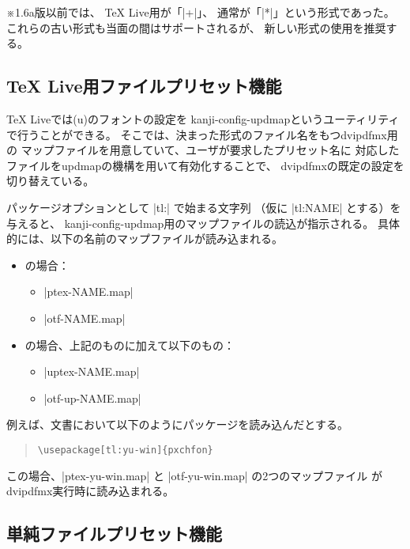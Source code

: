 \documentclass[uplatex,dvipdfmx,a4paper]{jsarticle}
\newcommand{\Note}{\par\noindent ※}
\newcommand{\Zk}{\mbox{}}
\providecommand{\Strong}[1]{\textsf{#1}}
\begin{document}
\Note 1.6a版以前では、
{\TeX} Live用が「|+|\Zk{}」、
通常が「|*|\Zk{}」という形式であった。
これらの古い形式も当面の間はサポートされるが、
新しい形式の使用を推奨する。

\subsection{{\TeX} Live用ファイルプリセット機能}

{\TeX} Liveでは{(u)\pLaTeX}のフォントの設定を
kanji-config-updmapというユーティリティで行うことができる。
そこでは、決まった形式のファイル名をもつdvipdfmx用の
マップファイルを用意していて、ユーザが要求したプリセット名に
対応したファイルをupdmapの機構を用いて有効化することで、
dvipdfmxの既定の設定を切り替えている。

パッケージオプションとして |tl:| で始まる文字列
（仮に |tl:NAME| とする）を与えると、
kanji-config-updmap用のマップファイルの読込が指示される。
具体的には、以下の名前のマップファイルが読み込まれる。

\begin{itemize}
\item {\pLaTeX}の場合：
  \begin{itemize}
  \item |ptex-NAME.map|
  \item |otf-NAME.map|
  \end{itemize}
\item {\upLaTeX}の場合、\Strong{上記のものに加えて}以下のもの：
  \begin{itemize}
  \item |uptex-NAME.map|
  \item |otf-up-NAME.map|
  \end{itemize}
\end{itemize}

例えば、{\pLaTeX}文書において以下のようにパッケージを読み込んだとする。

\begin{quote}\small\begin{verbatim}
\usepackage[tl:yu-win]{pxchfon}
\end{verbatim}\end{quote}

この場合、|ptex-yu-win.map| と |otf-yu-win.map| の2つのマップファイル
がdvipdfmx実行時に読み込まれる。

\subsection{単純ファイルプリセット機能}
\end{document}
